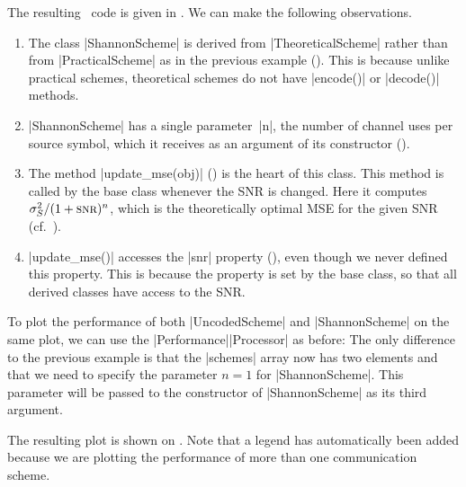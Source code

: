 The resulting \matlab\ code is given in . We can make the
following observations.
\begin{enumerate}
  \item The class |ShannonScheme| is derived from |TheoreticalScheme| rather
    than from |PracticalScheme| as in the previous example (). This
    is because unlike practical schemes, theoretical schemes do not have
    |encode()| or |decode()| methods. 
    
  \item |ShannonScheme| has a single parameter~|n|, the number of channel uses
    per source symbol, which it receives as an argument of its constructor
    ().

  \item The method |update_mse(obj)| () is the heart of this
    class. This method is called by the base class whenever the SNR is
    changed. Here it computes $\ssq / (1
    + \snr)^n$, which is the theoretically optimal MSE for the given SNR
    (cf.~).
    
  \item |update_mse()| accesses the |snr| property (), even though
    we never defined this property. This is because the property is set by the
    base class, so that all derived classes have access to the SNR.
\end{enumerate}

To plot the performance of both |UncodedScheme| and |ShannonScheme| on the same
plot, we can use the |Performance|\-|Processor| as before:
The only difference to the previous example is that the |schemes| array now has
two elements and that we need to specify the parameter $n=1$ for
|ShannonScheme|.  This parameter will be passed to the constructor of
|ShannonScheme| as its third argument.

The resulting plot is shown on . Note that a legend has
automatically been added because we are plotting the performance of more than
one communication scheme.

